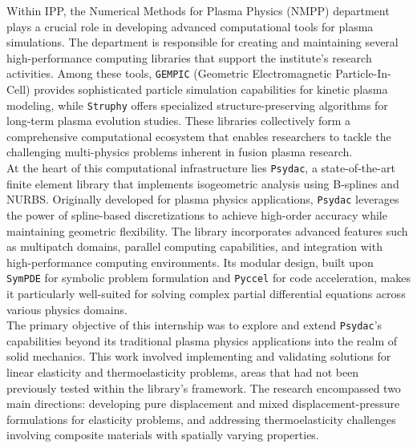 \documentclass[a4paper,12pt,twoside]{report}
\begin{document}
Within IPP, the Numerical Methods for Plasma Physics (NMPP) department plays a crucial role in developing advanced computational tools for plasma simulations. The department is responsible for creating and maintaining several high-performance computing libraries that support the institute's research activities. Among these tools, \texttt{GEMPIC} (Geometric Electromagnetic Particle-In-Cell) provides sophisticated particle simulation capabilities for kinetic plasma modeling, while \texttt{Struphy} offers specialized structure-preserving algorithms for long-term plasma evolution studies. These libraries collectively form a comprehensive computational ecosystem that enables researchers to tackle the challenging multi-physics problems inherent in fusion plasma research.\\

At the heart of this computational infrastructure lies \texttt{Psydac}, a state-of-the-art finite element library that implements isogeometric analysis using B-splines and NURBS. Originally developed for plasma physics applications, \texttt{Psydac} leverages the power of spline-based discretizations to achieve high-order accuracy while maintaining geometric flexibility. The library incorporates advanced features such as multipatch domains, parallel computing capabilities, and integration with high-performance computing environments. Its modular design, built upon \texttt{SymPDE} for symbolic problem formulation and \texttt{Pyccel} for code acceleration, makes it particularly well-suited for solving complex partial differential equations across various physics domains.\\

The primary objective of this internship was to explore and extend \texttt{Psydac}'s capabilities beyond its traditional plasma physics applications into the realm of solid mechanics. This work involved implementing and validating solutions for linear elasticity and thermoelasticity problems, areas that had not been previously tested within the library's framework. The research encompassed two main directions: developing pure displacement and mixed displacement-pressure formulations for elasticity problems, and addressing thermoelasticity challenges involving composite materials with spatially varying properties.\\
\end{document}
